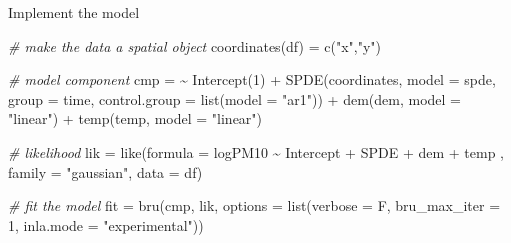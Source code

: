 \documentclass[
  ignorenonframetext,
]{beamer}
\newenvironment{Shaded}{\begin{snugshade}}{\end{snugshade}}
\newcommand{\AttributeTok}[1]{\textcolor[rgb]{0.77,0.63,0.00}{#1}}
\newcommand{\CommentTok}[1]{\textcolor[rgb]{0.56,0.35,0.01}{\textit{#1}}}
\newcommand{\DecValTok}[1]{\textcolor[rgb]{0.00,0.00,0.81}{#1}}
\newcommand{\ErrorTok}[1]{\textcolor[rgb]{0.64,0.00,0.00}{\textbf{#1}}}
\newcommand{\FunctionTok}[1]{\textcolor[rgb]{0.00,0.00,0.00}{#1}}
\newcommand{\NormalTok}[1]{#1}
\newcommand{\OtherTok}[1]{\textcolor[rgb]{0.56,0.35,0.01}{#1}}
\newcommand{\SpecialCharTok}[1]{\textcolor[rgb]{0.00,0.00,0.00}{#1}}
\newcommand{\StringTok}[1]{\textcolor[rgb]{0.31,0.60,0.02}{#1}}
\begin{document}
\begin{frame}[fragile]{Implement the model}
\protect\hypertarget{implement-the-model}{}
\small

\begin{Shaded}
\begin{Highlighting}[]
\CommentTok{\# make the data a spatial object}
\FunctionTok{coordinates}\NormalTok{(df) }\OtherTok{=} \FunctionTok{c}\NormalTok{(}\StringTok{"x"}\NormalTok{,}\StringTok{"y"}\NormalTok{)}

\CommentTok{\# model component}
\NormalTok{cmp  }\OtherTok{=} \ErrorTok{\textasciitilde{}} \FunctionTok{Intercept}\NormalTok{(}\DecValTok{1}\NormalTok{) }\SpecialCharTok{+} 
  \FunctionTok{SPDE}\NormalTok{(coordinates, }\AttributeTok{model =}\NormalTok{ spde,}
       \AttributeTok{group =}\NormalTok{ time, }\AttributeTok{control.group =} \FunctionTok{list}\NormalTok{(}\AttributeTok{model =} \StringTok{"ar1"}\NormalTok{)) }\SpecialCharTok{+}
  \FunctionTok{dem}\NormalTok{(dem, }\AttributeTok{model =} \StringTok{"linear"}\NormalTok{) }\SpecialCharTok{+} 
  \FunctionTok{temp}\NormalTok{(temp, }\AttributeTok{model =} \StringTok{"linear"}\NormalTok{)}

\CommentTok{\# likelihood}
\NormalTok{lik }\OtherTok{=} \FunctionTok{like}\NormalTok{(}\AttributeTok{formula =}\NormalTok{ logPM10 }\SpecialCharTok{\textasciitilde{}}\NormalTok{ Intercept }\SpecialCharTok{+}\NormalTok{ SPDE }\SpecialCharTok{+}\NormalTok{ dem }\SpecialCharTok{+}\NormalTok{ temp ,}
           \AttributeTok{family =} \StringTok{"gaussian"}\NormalTok{,}
           \AttributeTok{data =}\NormalTok{ df)}

\CommentTok{\# fit the model}
\NormalTok{fit }\OtherTok{=} \FunctionTok{bru}\NormalTok{(cmp, lik,}
          \AttributeTok{options =} \FunctionTok{list}\NormalTok{(}\AttributeTok{verbose =}\NormalTok{ F,}
                         \AttributeTok{bru\_max\_iter =} \DecValTok{1}\NormalTok{,}
                         \AttributeTok{inla.mode  =} \StringTok{"experimental"}\NormalTok{))}
\end{Highlighting}
\end{Shaded}
\end{frame}
\end{document}

